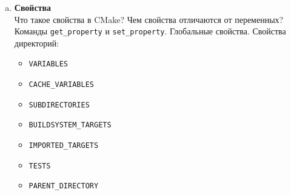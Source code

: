 \documentclass{article}
\begin{document}
\begin{enumerate}
\begin{enumerate}[a.]
\item \textbf{Свойства}\\
Что такое свойства в CMake? Чем свойства отличаются от переменных? Команды \texttt{get\_property} и \texttt{set\_property}. Глобальные свойства. Свойства директорий:
\begin{multicols}{2}
\begin{itemize}
\item \texttt{VARIABLES}
\item \texttt{CACHE\_VARIABLES}
\item \texttt{SUBDIRECTORIES}
\item \texttt{BUILDSYSTEM\_TARGETS}
\item \texttt{IMPORTED\_TARGETS}
\item \texttt{TESTS}
\item \texttt{PARENT\_DIRECTORY}
\end{itemize}
\end{multicols}


\end{enumerate}
\end{enumerate}
\end{document}
